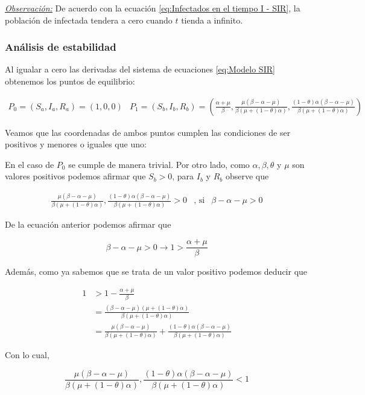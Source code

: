 \underline{\textit{Observación:}} De acuerdo con la ecuación \ref{eq:Infectados en el tiempo I - SIR}, la población de infectada tendera a cero cuando $t$ tienda a infinito.

\subsubsection{Análisis de estabilidad}

Al igualar a cero las derivadas del sistema de ecuaciones \ref{eq:Modelo SIR} obtenemos los puntos de equilibrio:

$$\begin{array}{cc}
P_0=(S_a,I_a,R_a)=(1,0,0) & P_1=(S_b,I_b,R_b)=\left(\frac{\alpha+\mu}{\beta},\frac{\mu(\beta-\alpha-\mu)}{\beta(\mu+(1-\theta)\alpha)},\frac{(1-\theta)\alpha(\beta-\alpha-\mu)}{\beta(\mu+(1-\theta)\alpha)}\right)
\end{array}$$

Veamos que las coordenadas de ambos puntos cumplen las condiciones de ser positivos y menores o iguales que uno: 

En el caso de $P_0$ se cumple de manera trivial. Por otro lado, como $\alpha,\beta,\theta$ y $\mu$ son valores positivos podemos afirmar que $S_b>0$, para $I_b$ y $R_b$ observe que 

$$\begin{array}{ccc}
\frac{\mu(\beta-\alpha-\mu)}{\beta(\mu+(1-\theta)\alpha)},\frac{(1-\theta)\alpha(\beta-\alpha-\mu)}{\beta(\mu+(1-\theta)\alpha)}>0 & \text{, si} & \beta-\alpha-\mu>0
\end{array}$$

De la ecuación anterior podemos afirmar que 

$$\beta-\alpha-\mu>0\longrightarrow1>\frac{\alpha+\mu}{\beta}$$

Además, como ya sabemos que se trata de un valor positivo podemos deducir que 

\begin{align*}
1&>1-\frac{\alpha+\mu}{\beta} \\
&= \frac{(\beta-\alpha-\mu)(\mu+(1-\theta)\alpha)}{\beta(\mu+(1-\theta)\alpha)}\\
&= \frac{\mu(\beta-\alpha-\mu)}{\beta(\mu+(1-\theta)\alpha)}+\frac{(1-\theta)\alpha(\beta-\alpha-\mu)}{\beta(\mu+(1-\theta)\alpha)}
\end{align*}

Con lo cual,

$$\frac{\mu(\beta-\alpha-\mu)}{\beta(\mu+(1-\theta)\alpha)},\frac{(1-\theta)\alpha(\beta-\alpha-\mu)}{\beta(\mu+(1-\theta)\alpha)}<1$$

